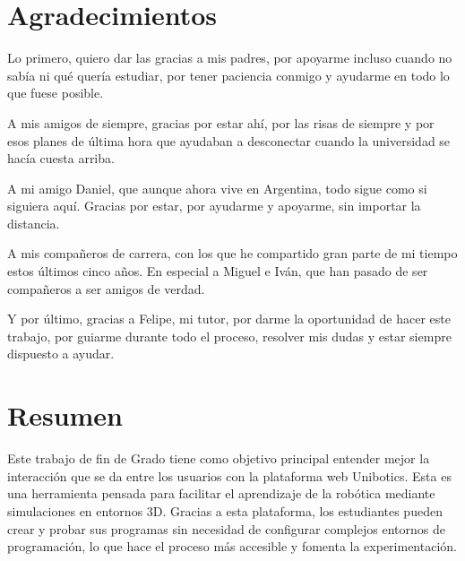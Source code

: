 \documentclass[a4paper, 12pt]{book}
\begin{document}

\chapter*{Agradecimientos}

Lo primero, quiero dar las gracias a mis padres, por apoyarme incluso cuando no sabía ni qué quería estudiar, por tener paciencia conmigo y ayudarme en todo lo que fuese posible.

A mis amigos de siempre, gracias por estar ahí, por las risas de siempre y por esos planes de última hora que ayudaban a desconectar cuando la universidad se hacía cuesta arriba.

A mi amigo Daniel, que aunque ahora vive en Argentina, todo sigue como si siguiera aquí. Gracias por estar, por ayudarme y apoyarme, sin importar la distancia.

A mis compañeros de carrera, con los que he compartido gran parte de mi tiempo estos últimos cinco años. En especial a Miguel e Iván, que han pasado de ser compañeros a ser amigos de verdad.

Y por último, gracias a Felipe, mi tutor, por darme la oportunidad de hacer este trabajo, por guiarme durante todo el proceso, resolver mis dudas y estar siempre dispuesto a ayudar. 


\chapter*{Resumen}

Este trabajo de fin de Grado tiene como objetivo principal entender mejor la interacción que se da entre los usuarios con la plataforma web Unibotics. Esta es una herramienta pensada para facilitar el aprendizaje de la robótica mediante simulaciones en entornos 3D. Gracias a esta plataforma, los estudiantes pueden crear y probar sus programas sin necesidad de configurar complejos entornos de programación, lo que hace el proceso más accesible y fomenta la experimentación.
\end{document}
